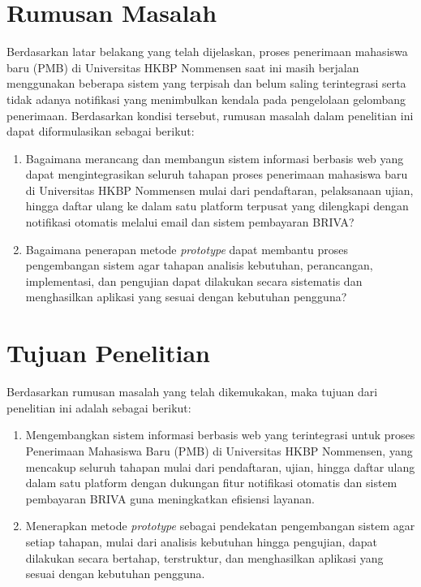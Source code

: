 \section{Rumusan Masalah} \label{I.Rumusan Masalah}
Berdasarkan latar belakang yang telah dijelaskan, proses penerimaan mahasiswa baru (PMB) di Universitas HKBP Nommensen saat ini masih berjalan menggunakan beberapa sistem yang terpisah dan belum saling terintegrasi serta tidak adanya notifikasi yang menimbulkan kendala pada pengelolaan gelombang penerimaan. Berdasarkan kondisi tersebut, rumusan masalah dalam penelitian ini dapat diformulasikan sebagai berikut:\par

\begin{enumerate}[noitemsep]
	\item Bagaimana merancang dan membangun sistem informasi berbasis web yang dapat mengintegrasikan seluruh tahapan proses penerimaan mahasiswa baru di Universitas HKBP Nommensen mulai dari pendaftaran, pelaksanaan ujian, hingga daftar ulang ke dalam satu platform terpusat yang dilengkapi dengan notifikasi otomatis melalui email dan sistem pembayaran BRIVA?
	\item Bagaimana penerapan metode \textit{prototype} dapat membantu proses pengembangan sistem agar tahapan analisis kebutuhan, perancangan, implementasi, dan pengujian dapat dilakukan secara sistematis dan menghasilkan aplikasi yang sesuai dengan kebutuhan pengguna?
\end{enumerate}

\section{Tujuan Penelitian} \label{I.Tujuan}
Berdasarkan rumusan masalah yang telah dikemukakan, maka tujuan dari penelitian ini adalah sebagai berikut:\par

\begin{enumerate}[noitemsep]
	\item Mengembangkan sistem informasi berbasis web yang terintegrasi untuk proses Penerimaan Mahasiswa Baru (PMB) di Universitas HKBP Nommensen, yang mencakup seluruh tahapan mulai dari pendaftaran, ujian, hingga daftar ulang dalam satu platform dengan dukungan fitur notifikasi otomatis dan sistem pembayaran BRIVA guna meningkatkan efisiensi layanan.
	\item Menerapkan metode \textit{prototype} sebagai pendekatan pengembangan sistem agar setiap tahapan, mulai dari analisis kebutuhan hingga pengujian, dapat dilakukan secara bertahap, terstruktur, dan menghasilkan aplikasi yang sesuai dengan kebutuhan pengguna.
\end{enumerate}

